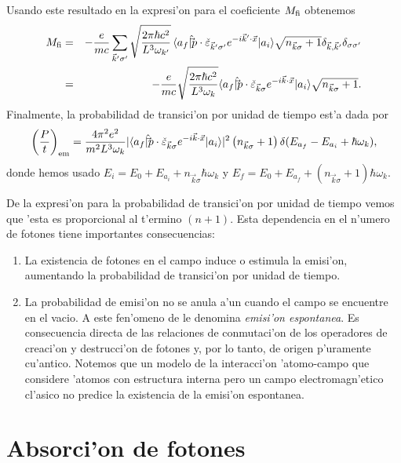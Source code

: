 Usando este resultado en la expresi'on para el coeficiente $M_{\rm fi}$
obtenemos
\begin{eqnarray}
M_{\rm fi}&=&-\frac{e}{mc}\sum_{\vec{k}'\sigma'}
\sqrt{\frac{2\pi\hbar c^2}{L^3 \omega_{k'}}}\thinspace
\langle a_f|{\hat\vec{p}}\cdot\check{\varepsilon}_{\vec{k}'\sigma'}e^{-i\vec{k}
'\cdot\vec{x}}|a_i\rangle \sqrt{n_{\vec{k}\sigma}+1}\delta_{\vec{k},\vec{k}'}
\delta_{\sigma\sigma'} \\
&=&-\frac{e}{mc}\sqrt{\frac{2\pi\hbar c^2}{L^3 \omega_k}}
\langle a_f|{\hat\vec{p}}\cdot\check{\varepsilon}_{\vec{k}\sigma}e^{-i\vec{k}
\cdot\vec{x}}|a_i\rangle \sqrt{n_{\vec{k}\sigma}+1}.
\end{eqnarray}
Finalmente, la probabilidad de transici'on por unidad de tiempo est'a dada por
\begin{equation}
\left( \frac{P}{t}\right)_{\rm em}=\frac{4\pi^2e^2}{m^2L^3\omega_k}
|\langle a_f|{\hat\vec{p}}\cdot\check{\varepsilon}_{\vec{k}\sigma}e^{-i\vec{k}
\cdot\vec{x}}|a_i\rangle |^2\left( n_{\vec{k}\sigma}+1\right)
\delta(E_{a_f}-E_{a_i}+\hbar\omega_k),
\end{equation}
donde hemos usado $E_i=E_0+E_{a_i}+n_{\vec{k}\sigma}\hbar\omega_k$ y
$E_f=E_0+E_{a_f}+(n_{\vec{k}\sigma}+1)\hbar\omega_k$.

De la expresi'on para la probabilidad de transici'on por unidad de tiempo vemos
que 'esta es proporcional al t'ermino $(n+1)$. Esta dependencia en el n'umero de
fotones tiene importantes consecuencias:
\begin{enumerate}
\item La existencia de fotones en el campo induce o estimula la emisi'on,
aumentando la probabilidad de transici'on por unidad de tiempo.
\item La probabilidad de emisi'on no se anula a'un cuando el campo se encuentre
en el vacio. A este fen'omeno de le denomina \textit{emisi'on espontanea}. Es
consecuencia directa de las relaciones de conmutaci'on de los operadores de
creaci'on y destrucci'on de fotones y, por lo tanto, de origen p'uramente 
cu'antico. Notemos que un modelo de la interacci'on 'atomo-campo que considere
'atomos con estructura interna pero un campo electromagn'etico cl'asico no
predice la existencia de la emisi'on espontanea.
\end{enumerate}

\section{Absorci'on de fotones}

